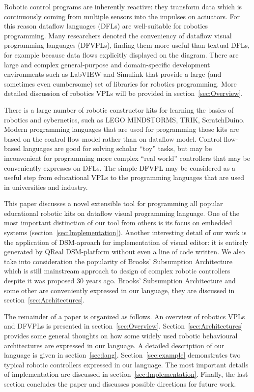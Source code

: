 \documentclass[conference,compsoc]{IEEEtran}
\begin{document}
Robotic control programs are inherently reactive: they transform data which is continuously coming from multiple sensors into the impulses on actuators. For this reason dataflow languages (DFLs) are well-suitable for robotics programming. Many researchers denoted the conveniency of dataflow visual programming languages (DFVPLs)\cite{johnston2004advances}, finding them more useful than textual DFLs, for example because data flows explicitly displayed on the diagram. There are large and complex general-purpose and domain-specific development environments such as LabVIEW\cite{labview} and Simulink\cite{simulink} that provide a large (and sometimes even cumbersome) set of libraries for robotics programming. More detailed discussion of robotics VPLs will be provided in section~\ref{sec:Overview}.

There is a large number of robotic constructor kits for learning the basics of robotics and cybernetics, such as LEGO MINDSTORMS\cite{legokit}, TRIK, ScratchDuino\cite{ScratchDuino}. Modern programming languages that are used for programming those kits are based on the control flow model rather than on dataflow model. Control flow-based languages are good for solving scholar ``toy'' tasks, but may be inconvenient for programming more complex ``real world'' controllers that may be conveniently expresses on DFLs. The simple DFVPL may be considered as a useful step from educational VPLs to the programming languages that are used in universities and industry. 


This paper discusses a novel extensible tool for programming all popular educational robotic kits on dataflow visual programming language. One of the most important distinction of our tool from others is its focus on embedded systems (section~\ref{sec:Implementation}). Another interesting detail of our work is the application of DSM-aproach for implementation of visual editor: it is entirely generated by QReal DSM-platform\cite{qrealMeta}\cite{kuzenkova2013qreal} without even a line of code written. We also take into consideration the popularity of Brooks' Subsumption Architecture\cite{brooks1986robust} which is still mainstream approach to design of complex robotic controllers\cite{banyasad2000visual,simpson2006mobile,posso2011process,proetzsch2007behaviour} despite it was proposed 30 years ago. Brooks' Subsumption Architecture and some other are conveniently expressed in our language, they are discussed in section~\ref{sec:Architectures}.

The remainder of a paper is organized as follows. An overview of robotics VPLs and DFVPLs is presented in section~\ref{sec:Overview}. Section~\ref{sec:Architectures} provides some general thoughts on how some widely used robotic behavioural architectures are expressed in our language. A detailed description of our language is given in section~\ref{sec:lang}. Section~\ref{sec:example} demonstrates two typical robotic controllers expressed in our language. The most important details of implementation are discussed in section~\ref{sec:Implementation}. Finally, the last section concludes the paper and discusses possible directions for future work.
\end{document}
